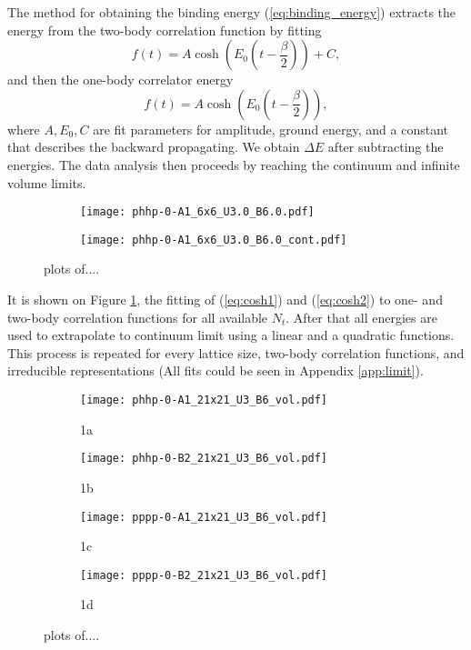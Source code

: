 The method for obtaining the binding energy (\ref{eq:binding_energy}) extracts the energy from the two-body correlation function by fitting
\begin{equation}
    f(t) = A\cosh(E_0(t-\frac{\beta}{2})) + C,
    \label{eq:cosh2}
\end{equation}
and then the one-body correlator energy
\begin{equation}
    f(t) = A\cosh(E_0(t-\frac{\beta}{2})),
    \label{eq:cosh1}
\end{equation}
where $A, E_0, C$ are fit parameters for amplitude, ground energy, and a constant that describes the backward propagating. We obtain $\Delta E$ after subtracting the energies. The data analysis then proceeds by reaching the continuum and infinite volume limits.
\begin{figure}
    \begin{subfigure}{.5\textwidth}
      \centering
      \texttt{[image: phhp-0-A1\_6x6\_U3.0\_B6.0.pdf]}
    \end{subfigure}%
    \begin{subfigure}{.5\textwidth}
      \centering
      \texttt{[image: phhp-0-A1\_6x6\_U3.0\_B6.0\_cont.pdf]}
    \end{subfigure}
    \caption{plots of....}
    \label{fig:cont_lim}
\end{figure}
It is shown on Figure \ref{fig:cont_lim}, the fitting of (\ref{eq:cosh1}) and (\ref{eq:cosh2}) to one- and two-body correlation functions for all available $N_t$. After that all energies are used to extrapolate to continuum limit using a linear and a quadratic functions. This process is repeated for every lattice size, two-body correlation functions, and irreducible representations (All fits could be seen in Appendix \ref{app:limit}).
\begin{figure}
    \begin{subfigure}{.5\textwidth}
      \centering
      \texttt{[image: phhp-0-A1\_21x21\_U3\_B6\_vol.pdf]}
      \caption{1a}
      \label{fig:sfig1}
    \end{subfigure}%
    \begin{subfigure}{.5\textwidth}
      \centering
      \texttt{[image: phhp-0-B2\_21x21\_U3\_B6\_vol.pdf]}
      \caption{1b}
      \label{fig:sfig2}
    \end{subfigure}
    \begin{subfigure}{.5\textwidth}
        \centering
        \texttt{[image: pppp-0-A1\_21x21\_U3\_B6\_vol.pdf]}
        \caption{1c}
        \label{fig:sfig3}
    \end{subfigure}
    \begin{subfigure}{.5\textwidth}
        \centering
        \texttt{[image: pppp-0-B2\_21x21\_U3\_B6\_vol.pdf]}
        \caption{1d}
        \label{fig:sfig4}
    \end{subfigure}
    \caption{plots of....}
    \label{fig:u3vol}
  \end{figure}
